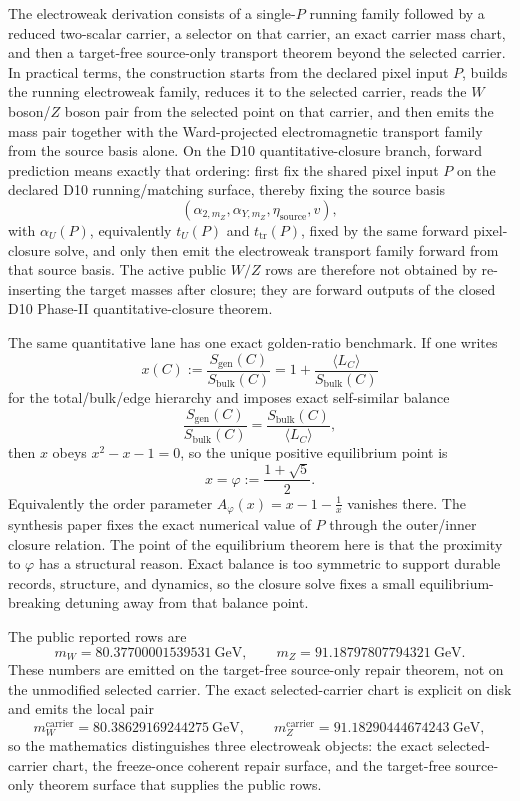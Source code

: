\documentclass[11pt]{article}
\begin{document}
The electroweak derivation consists of a single-\(P\) running family followed by a
reduced two-scalar carrier, a selector on that carrier, an exact carrier mass chart, and
then a target-free source-only transport theorem beyond the selected carrier. In practical terms, the construction starts from
the declared pixel input \(P\), builds the running electroweak family, reduces it to the selected
carrier, reads the \(W\) boson/\(Z\) boson pair from the selected point on that carrier,
and then emits the mass pair together with the Ward-projected electromagnetic transport family from
the source basis alone.
On the D10 quantitative-closure branch, forward prediction means exactly that ordering: first fix the shared pixel input \(P\) on the
declared D10 running/matching surface, thereby fixing the source basis
\[
(\alpha_{2,m_Z},\alpha_{Y,m_Z},\eta_{\mathrm{source}},v),
\]
with \(\alpha_U(P)\), equivalently \(t_U(P)\) and \(t_{\mathrm{tr}}(P)\), fixed by the
same forward pixel-closure solve,
and only then emit the electroweak transport family forward from that source basis. The
active public \(W/Z\) rows are therefore not obtained by re-inserting the target masses after
closure; they are forward outputs of the closed D10 Phase-II quantitative-closure theorem.

The same quantitative lane has one exact golden-ratio benchmark. If one writes
\[
x(C):=\frac{S_{\mathrm{gen}}(C)}{S_{\mathrm{bulk}}(C)}
=
1+\frac{\langle L_C\rangle}{S_{\mathrm{bulk}}(C)}
\]
for the total/bulk/edge hierarchy and imposes exact self-similar balance
\[
\frac{S_{\mathrm{gen}}(C)}{S_{\mathrm{bulk}}(C)}
=
\frac{S_{\mathrm{bulk}}(C)}{\langle L_C\rangle},
\]
then \(x\) obeys \(x^2-x-1=0\), so the unique positive equilibrium point is
\[
x=\varphi:=\frac{1+\sqrt5}{2}.
\]
Equivalently the order parameter \(A_\varphi(x)=x-1-\frac1x\) vanishes there. The synthesis paper
fixes the exact numerical value of \(P\) through the outer/inner closure relation. The point of
the equilibrium theorem here is that the proximity to \(\varphi\) has a structural reason. Exact
balance is too symmetric to support durable records, structure, and dynamics, so the closure solve
fixes a small
equilibrium-breaking detuning away from that balance point.

The public reported rows are
\[
m_W = 80.37700001539531~\mathrm{GeV},
\qquad
m_Z = 91.18797807794321~\mathrm{GeV}.
\]
These numbers are emitted on the target-free source-only repair theorem, not on the unmodified
selected carrier. The exact selected-carrier chart is explicit on disk and emits
the local pair
\[
m_W^{\mathrm{carrier}} = 80.38629169244275~\mathrm{GeV},
\qquad
m_Z^{\mathrm{carrier}} = 91.18290444674243~\mathrm{GeV},
\]
so the mathematics distinguishes three electroweak objects: the exact selected-carrier chart, the
freeze-once coherent repair surface, and the target-free source-only theorem surface that supplies
the public rows.
\end{document}
